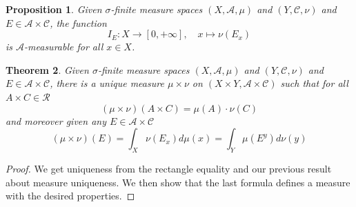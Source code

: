 \documentclass[11pt]{article}
\newtheorem{theorem}{Theorem}[section]
\newtheorem{prop}[theorem]{Proposition}
\begin{document}
\begin{prop}
Given $\sigma$-finite measure spaces $(X, \mathcal{A}, \mu)$ and $(Y, \mathcal{C}, \nu)$ and $E\in\mathcal{A}\times \mathcal{C}$, the function 
\[
	I_E:X\to [0, +\infty], \quad x\mapsto \nu(E_x)
\]
is $\mathcal{A}$-measurable for all $x\in X$.
\end{prop}
\begin{theorem}
Given $\sigma$-finite measure spaces $(X, \mathcal{A}, \mu)$ and $(Y, \mathcal{C}, \nu)$ and $E\in\mathcal{A}\times \mathcal{C}$, there is a unique measure $\mu\times\nu$ on $(X\times Y, \mathcal{A}\times\mathcal{C})$ such that for all $A\times C\in \mathcal{R}$
\[
	(\mu \times \nu)(A\times C)=\mu(A)\cdot\nu(C)
\]
and moreover given any $E\in\mathcal{A}\times\mathcal{C}$
\[
	(\mu\times\nu)(E)=\int_X \nu(E_x)d\mu(x) = \int_Y \mu(E^y)d\nu(y)
\]
\end{theorem}
\begin{proof}
We get uniqueness from the rectangle equality and our previous result about measure uniqueness.
We then show that the last formula defines a measure with the desired properties.
\end{proof}
\end{document}
